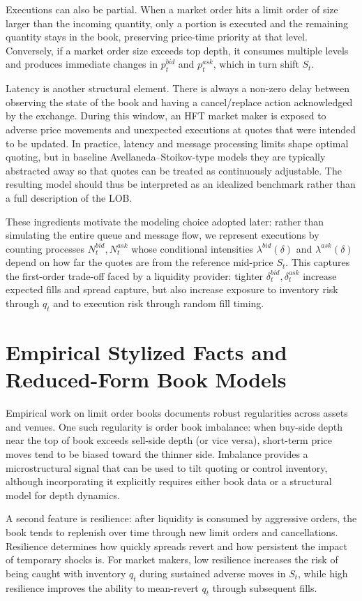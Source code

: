 \documentclass[a4paper,10pt,titlepage,oneside,openany]{book}
\theoremstyle{plain}\newtheorem{theorem}{Theorem}[chapter]
\theoremstyle{definition}\newtheorem{definition}{Definition}[chapter]
\theoremstyle{remark}\newtheorem{remark}{Remark}[chapter]
\begin{document}
Executions can also be partial. When a market order hits a limit order of size larger than the incoming quantity, only a portion is executed and the remaining quantity stays in the book, preserving price-time priority at that level. Conversely, if a market order size exceeds top depth, it consumes multiple levels and produces immediate changes in $p_t^{bid}$ and $p_t^{ask}$, which in turn shift $S_t$.

Latency is another structural element. There is always a non-zero delay between observing the state of the book and having a cancel/replace action acknowledged by the exchange. During this window, an HFT market maker is exposed to adverse price movements and unexpected executions at quotes that were intended to be updated. In practice, latency and message processing limits shape optimal quoting, but in baseline Avellaneda--Stoikov-type models they are typically abstracted away so that quotes can be treated as continuously adjustable. The resulting model should thus be interpreted as an idealized benchmark rather than a full description of the LOB.

These ingredients motivate the modeling choice adopted later: rather than simulating the entire queue and message flow, we represent executions by counting processes $N_t^{bid},N_t^{ask}$ whose conditional intensities $\lambda^{bid}(\delta)$ and $\lambda^{ask}(\delta)$ depend on how far the quotes are from the reference mid-price $S_t$. This captures the first-order trade-off faced by a liquidity provider: tighter $\delta_t^{bid},\delta_t^{ask}$ increase expected fills and spread capture, but also increase exposure to inventory risk through $q_t$ and to execution risk through random fill timing.

\section{Empirical Stylized Facts and Reduced-Form Book Models}
Empirical work on limit order books documents robust regularities across assets and venues. One such regularity is order book imbalance: when buy-side depth near the top of book exceeds sell-side depth (or vice versa), short-term price moves tend to be biased toward the thinner side. Imbalance provides a microstructural signal that can be used to tilt quoting or control inventory, although incorporating it explicitly requires either book data or a structural model for depth dynamics.

A second feature is resilience: after liquidity is consumed by aggressive orders, the book tends to replenish over time through new limit orders and cancellations. Resilience determines how quickly spreads revert and how persistent the impact of temporary shocks is. For market makers, low resilience increases the risk of being caught with inventory $q_t$ during sustained adverse moves in $S_t$, while high resilience improves the ability to mean-revert $q_t$ through subsequent fills.
\end{document}
